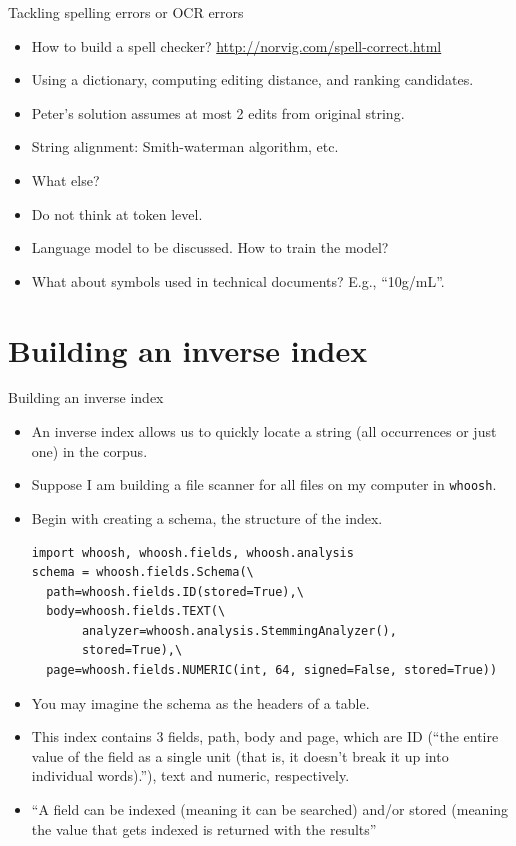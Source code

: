 \documentclass[11pt, handout]{beamer}
\begin{document}
\begin{frame}{Tackling spelling errors or OCR errors}
 \begin{itemize}[<+->]
  \item How to build a spell checker? \url{http://norvig.com/spell-correct.html}
  \item Using a dictionary, computing editing distance, and ranking candidates. 
  \item Peter's solution assumes at most 2 edits from original string. 
  \item String alignment: Smith-waterman algorithm, etc. 
  \item What else? 
  \item Do not think at token level. 
  \item Language model to be discussed. How to train the model? 
  \item What about symbols used in technical documents? E.g., ``10g/mL''. 
 \end{itemize}
\end{frame}

\section{Building an inverse index}

\begin{frame}{Building an inverse index}
\begin{itemize}[<+->]
 \item An inverse index allows us to quickly locate a string (all occurrences or just one) in the corpus. 
 \item Suppose I am building a file scanner for all files on my computer in \texttt{whoosh}.
 \item Begin with creating a schema, the structure of the index.
 {\scriptsize
 \begin{lstlisting}
import whoosh, whoosh.fields, whoosh.analysis
schema = whoosh.fields.Schema(\
  path=whoosh.fields.ID(stored=True),\
  body=whoosh.fields.TEXT(\
       analyzer=whoosh.analysis.StemmingAnalyzer(),
       stored=True),\
  page=whoosh.fields.NUMERIC(int, 64, signed=False, stored=True))
 \end{lstlisting}
 }
\item You may imagine the schema as the headers of a table. 
\item This index contains 3 fields, path, body and page, which are ID (``the entire value of the field as a single unit (that is, it doesn’t break it up into individual words).''), text and numeric, respectively. 

\item ``A field can be indexed (meaning it can be searched) and/or stored (meaning the value that gets indexed is returned with the results'' 
\end{itemize}
\end{frame}
\end{document}

